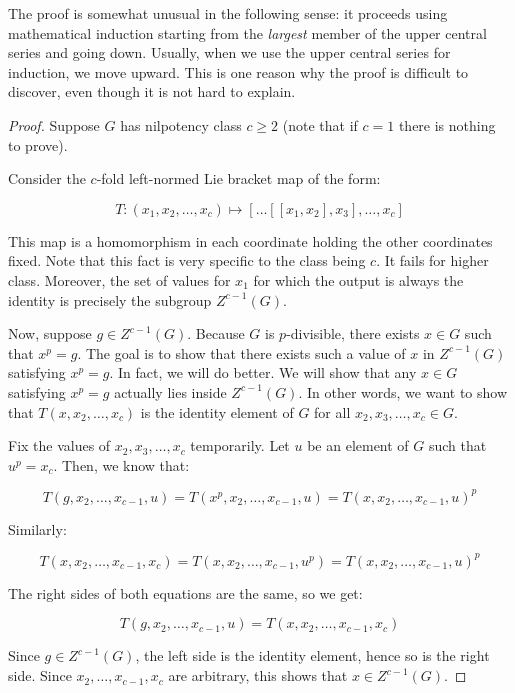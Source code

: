 \documentclass{ucetd}
\begin{document}
The proof is somewhat unusual in the following sense: it proceeds
using mathematical induction starting from the {\em largest} member of
the upper central series and going down. Usually, when we use the
upper central series for induction, we move upward. This is one reason
why the proof is difficult to discover, even though it is not hard to
explain.

\begin{proof}
  Suppose $G$ has nilpotency class $c \ge 2$ (note that if $c = 1$
  there is nothing to prove).

  Consider the $c$-fold left-normed Lie bracket map of the form:

  $$T:(x_1,x_2,\dots,x_c) \mapsto [\dots [[x_1,x_2],x_3],\dots,x_c]$$

  This map is a homomorphism in each coordinate holding the other
  coordinates fixed. Note that this fact is very specific to the class
  being $c$. It fails for higher class. Moreover, the set of values
  for $x_1$ for which the output is always the identity is precisely
  the subgroup $Z^{c-1}(G)$.

  Now, suppose $g \in Z^{c-1}(G)$. Because $G$ is $p$-divisible, there
  exists $x \in G$ such that $x^p = g$. The goal is to show that there
  exists such a value of $x$ in $Z^{c-1}(G)$ satisfying $x^p = g$. In
  fact, we will do better. We will show that any $x \in G$ satisfying
  $x^p = g$ actually lies inside $Z^{c-1}(G)$. In other words, we want
  to show that $T(x,x_2,\dots,x_c)$ is the identity element of $G$ for
  all $x_2,x_3,\dots,x_c \in G$.

  Fix the values of $x_2,x_3,\dots,x_c$ temporarily. Let $u$ be an
  element of $G$ such that $u^p = x_c$. Then, we know that:

  $$T(g,x_2,\dots,x_{c-1},u) = T(x^p,x_2,\dots,x_{c-1},u) = T(x,x_2,\dots,x_{c-1},u)^p$$

  Similarly:

  $$T(x,x_2,\dots,x_{c-1},x_c) = T(x,x_2,\dots,x_{c-1},u^p) = T(x,x_2,\dots,x_{c-1},u)^p$$

  The right sides of both equations are the same, so we get:

  $$T(g,x_2,\dots,x_{c-1},u) = T(x,x_2,\dots,x_{c-1},x_c)$$

  Since $g \in Z^{c-1}(G)$, the left side is the identity element,
  hence so is the right side. Since $x_2,\dots,x_{c-1},x_c$ are
  arbitrary, this shows that $x \in Z^{c-1}(G)$.


\end{proof}
\end{document}
